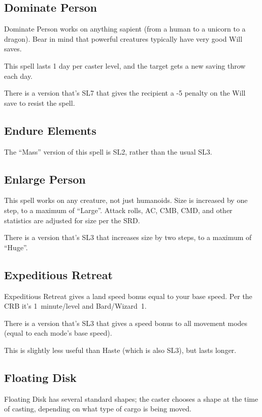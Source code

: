 %
\subsection{Dominate Person}

Dominate Person works on anything sapient (from a human to a unicorn to a
dragon). Bear in mind that powerful creatures typically have very good Will
saves.

This spell lasts 1 day per caster level, and the target gets a new saving
throw each day.

There is a version that's SL7 that gives the recipient a -5 penalty on the
Will save to resist the spell.
%

%
\subsection{Endure Elements}

The ``Mass'' version of this spell is SL2, rather than the usual SL3.
%

%
\subsection{Enlarge Person}

This spell works on any creature, not just humanoids. Size is increased by
one step, to a maximum of ``Large''. Attack rolls, AC, CMB, CMD, and other
statistics are adjusted for size per the SRD.

There is a version that's SL3 that increases size by two steps, to a maximum
of ``Huge''.
%

%
\subsection{Expeditious Retreat}

Expeditious Retreat gives a land speed bonus equal to your base speed.
Per the CRB it's 1~minute/level and Bard/Wizard~1.

There is a version that's SL3 that gives a speed bonus to all movement
modes (equal to each mode's base speed).

This is slightly less useful than Haste (which is also SL3), but lasts
longer.
%

%
\subsection{Floating Disk}

Floating Disk has several standard shapes; the caster chooses a shape at
the time of casting, depending on what type of cargo is being moved.

